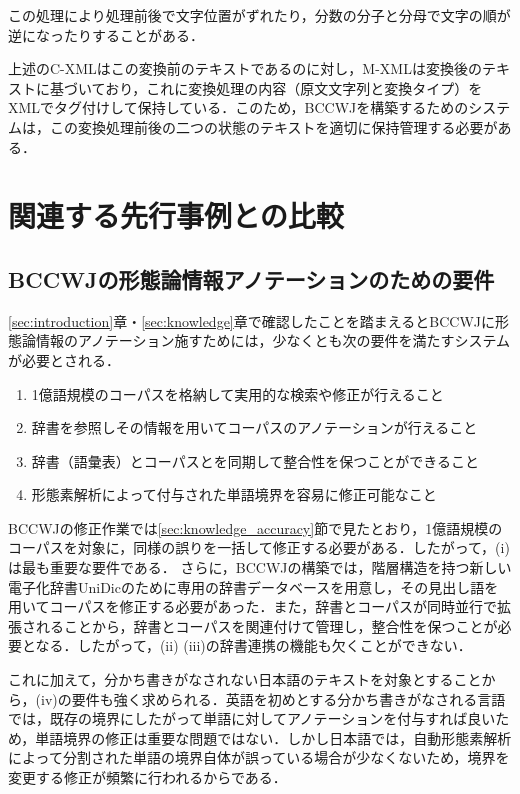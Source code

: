 \documentclass[japanese]{jnlp_1.4}
\begin{document}
この処理により処理前後で文字位置がずれたり，分数の分子と分母で文字の順が逆になったりすることがある．

上述のC-XMLはこの変換前のテキストであるのに対し，M-XMLは変換後のテキストに基づいており，これに変換処理の内容（原文文字列と変換タイプ）をXMLでタグ付けして保持している．このため，BCCWJを構築するためのシステムは，この変換処理前後の二つの状態のテキストを適切に保持管理する必要がある．


\section{関連する先行事例との比較}
\label{sec:related}

\subsection{BCCWJの形態論情報アノテーションのための要件}

\ref{sec:introduction}章・\ref{sec:knowledge}章で確認したことを踏まえるとBCCWJに形態論情報のアノテーション施すためには，少なくとも次の要件を満たすシステムが必要とされる．

\begin{enumerate}
\def\theenumi{}
\item	1億語規模のコーパスを格納して実用的な検索や修正が行えること
\item	辞書を参照しその情報を用いてコーパスのアノテーションが行えること
\item	辞書（語彙表）とコーパスとを同期して整合性を保つことができること
\item	形態素解析によって付与された単語境界を容易に修正可能なこと
\end{enumerate}

BCCWJの修正作業では\ref{sec:knowledge_accuracy}節で見たとおり，1億語規模のコーパスを対象に，同様の誤りを一括して修正する必要がある．したがって，(i)は最も重要な要件である．
さらに，BCCWJの構築では，階層構造を持つ新しい電子化辞書UniDicのために専用の辞書データベースを用意し，その見出し語を用いてコーパスを修正する必要があった．また，辞書とコーパスが同時並行で拡張されることから，辞書とコーパスを関連付けて管理し，整合性を保つことが必要となる．したがって，(ii) (iii)の辞書連携の機能も欠くことができない．

これに加えて，分かち書きがなされない日本語のテキストを対象とすることから，(iv)の要件も強く求められる．英語を初めとする分かち書きがなされる言語では，既存の境界にしたがって単語に対してアノテーションを付与すれば良いため，単語境界の修正は重要な問題ではない．しかし日本語では，自動形態素解析によって分割された単語の境界自体が誤っている場合が少なくないため，境界を変更する修正が頻繁に行われるからである．
\end{document}

